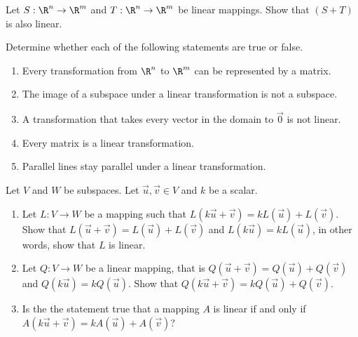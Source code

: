 \begin{exercises}
\begin{problist}
		\prob Let $S:\R^n\to\R^m$ and $T:\R^n\to\R^m$ be linear mappings.
		Show that $(S+T)$ is also linear.

		\prob Determine whether each of the following statements are true or false.
		\begin{enumerate}
			\item Every transformation from $\R^n$ to $\R^m$ can be represented by a matrix.
			\item The image of a subspace under a linear transformation is not a subspace.
			\item A transformation that takes every vector in the domain to $\vec 0$ is not linear.
			\item Every matrix is a linear transformation.
			\item Parallel lines stay parallel under a linear transformation.
		\end{enumerate}

		\prob Let $V$ and $W$ be subspaces. Let $\vec u,\vec v \in V$ and $k$ be a scalar.
		\begin{enumerate}
			\item
			Let $L:V\to W$ be a mapping such that $L(k\vec u+\vec v)=kL(\vec u)+L(\vec v)$.
			Show that $L(\vec u+\vec v)=L(\vec u)+L(\vec v)$ and $L(k\vec u)=kL(\vec u)$,
			in other words, show that $L$ is linear.
			\item Let $Q:V\to W$ be a linear mapping, that is
			$Q(\vec u+\vec v)=Q(\vec u)+Q(\vec v)$ and $Q(k\vec u)=kQ(\vec u)$.
			Show that $Q(k\vec u+\vec v)=kQ(\vec u)+Q(\vec v)$.
			\item Is the the statement true that a mapping $A$ is linear if and only if
			$A(k\vec u+\vec v)=kA(\vec u)+A(\vec v)$?
		\end{enumerate}
	\end{problist}
\end{exercises}
